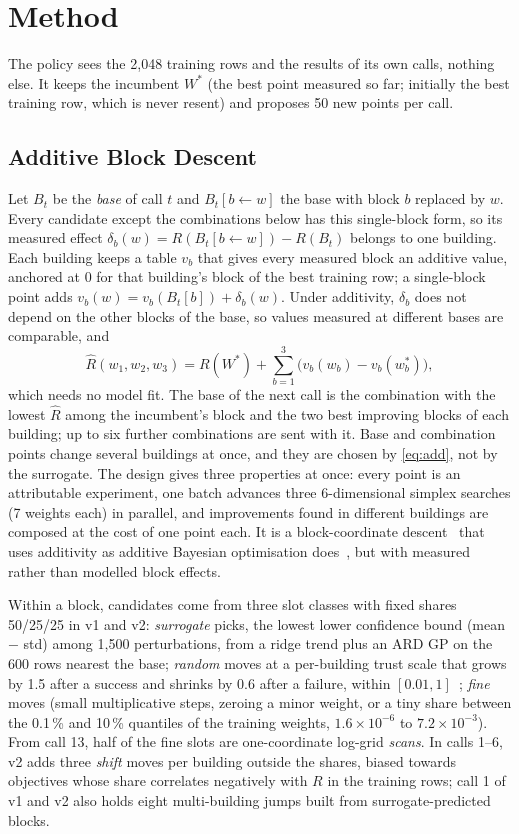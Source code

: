 \section{Method}
\label{sec:method}
The policy sees the 2,048 training rows and the results of its own calls, nothing else. It keeps the incumbent
$W^\ast$ (the best point measured so far; initially the best training row, which is never resent) and proposes 50 new
points per call.

\subsection{Additive Block Descent}
\label{sec:block}
Let $B_t$ be the \emph{base} of call $t$ and $B_t[b\!\leftarrow\!w]$ the base with block $b$ replaced by $w$. Every
candidate except the combinations below has this single-block form, so its measured effect
$\delta_b(w)=R(B_t[b\!\leftarrow\!w])-R(B_t)$ belongs to one building. Each building keeps a table $v_b$ that gives
every measured block an additive value, anchored at $0$ for that building's block of the best training row; a
single-block point adds $v_b(w)=v_b(B_t[b])+\delta_b(w)$. Under additivity, $\delta_b$ does not depend on the other
blocks of the base, so values measured at different bases are comparable, and
\begin{equation}
\hat R(w_1,w_2,w_3)=R(W^\ast)+\textstyle\sum_{b=1}^{3}\bigl(v_b(w_b)-v_b(w^\ast_b)\bigr),
\label{eq:add}
\end{equation}
which needs no model fit. The base of the next call is the combination with the lowest $\hat R$ among the incumbent's
block and the two best improving blocks of each building; up to six further combinations are sent with it. Base and
combination points change several buildings at once, and they are chosen by \eqref{eq:add}, not by the surrogate. The
design gives three properties at once: every point is an attributable experiment, one batch advances three
6-dimensional simplex searches (7 weights each) in parallel, and improvements found in different buildings are composed at the cost of one
point each. It is a block-coordinate descent~\cite{bcd} that uses additivity as additive Bayesian optimisation
does~\cite{addgp}, but with measured rather than modelled block effects.

Within a block, candidates come from three slot classes with fixed shares 50/25/25 in v1 and v2: \emph{surrogate} picks, the lowest lower confidence bound
(mean $-$ std) among 1,500 perturbations, from a ridge trend plus an ARD GP on the 600 rows nearest the base;
\emph{random} moves at a per-building trust scale that grows by 1.5 after a success and shrinks by 0.6 after a failure,
within $[0.01,1]$~\cite{turbo}; \emph{fine} moves (small multiplicative steps, zeroing a minor weight, or a tiny share
between the 0.1\,\% and 10\,\% quantiles of the training weights, $1.6\times10^{-6}$ to $7.2\times10^{-3}$). From
call 13, half of the fine slots are one-coordinate log-grid \emph{scans}. In calls 1--6, v2 adds three \emph{shift}
moves per building outside the shares, biased towards objectives whose share correlates negatively with $R$ in the
training rows; call 1 of v1 and v2 also holds eight multi-building jumps built from surrogate-predicted blocks.

